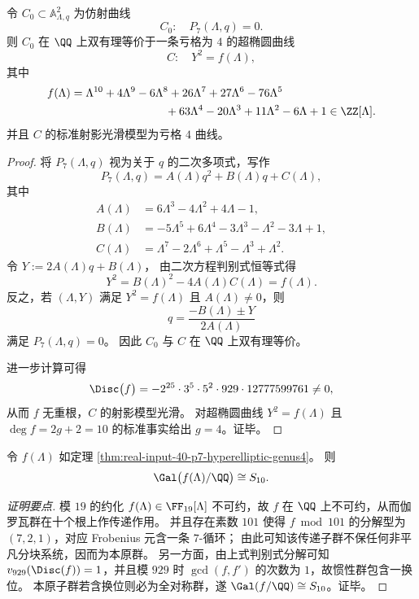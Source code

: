 \begin{theorem}[谱曲线的超椭圆模型与亏格]\label{thm:real-input-40-p7-hyperelliptic-genus4}
令 \(C_0\subset\mathbb{A}^2_{\Lambda,q}\) 为仿射曲线
\[
C_0:\quad P_7(\Lambda,q)=0.
\]
则 \(C_0\) 在 \(\QQ\) 上双有理等价于一条亏格为 \(4\) 的超椭圆曲线
\[
C:\quad Y^2=f(\Lambda),
\]
其中
\[
\begin{aligned}
f(\Lambda)=\;&\Lambda^{10}+4\Lambda^9-6\Lambda^8+26\Lambda^7+27\Lambda^6-76\Lambda^5\\
&\qquad\qquad\qquad\quad +63\Lambda^4-20\Lambda^3+11\Lambda^2-6\Lambda+1\in\ZZ[\Lambda].
\end{aligned}
\]
并且 \(C\) 的标准射影光滑模型为亏格 \(4\) 曲线。
\end{theorem}
\begin{proof}
将 \(P_7(\Lambda,q)\) 视为关于 \(q\) 的二次多项式，写作
\[
P_7(\Lambda,q)=A(\Lambda)q^2+B(\Lambda)q+C(\Lambda),
\]
其中
\[
\begin{aligned}
A(\Lambda)&=6\Lambda^3-4\Lambda^2+4\Lambda-1,\\
B(\Lambda)&=-5\Lambda^5+6\Lambda^4-3\Lambda^3-\Lambda^2-3\Lambda+1,\\
C(\Lambda)&=\Lambda^7-2\Lambda^6+\Lambda^5-\Lambda^3+\Lambda^2.
\end{aligned}
\]
令
\(
Y:=2A(\Lambda)q+B(\Lambda)
\)，
由二次方程判别式恒等式得
\[
Y^2=B(\Lambda)^2-4A(\Lambda)C(\Lambda)=f(\Lambda).
\]
反之，若 \((\Lambda,Y)\) 满足 \(Y^2=f(\Lambda)\) 且 \(A(\Lambda)\neq 0\)，则
\[
q=\frac{-B(\Lambda)\pm Y}{2A(\Lambda)}
\]
满足 \(P_7(\Lambda,q)=0\)。
因此 \(C_0\) 与 \(C\) 在 \(\QQ\) 上双有理等价。
\par
进一步计算可得
\[
\Disc\bigl(f\bigr)=-2^{25}\cdot 3^5\cdot 5^2\cdot 929\cdot 12777599761\neq 0,
\]
从而 \(f\) 无重根，\(C\) 的射影模型光滑。
对超椭圆曲线 \(Y^2=f(\Lambda)\) 且 \(\deg f=2g+2=10\) 的标准事实给出 \(g=4\)。证毕。
\end{proof}

\begin{proposition}[分支十次多项式的满对称伽罗瓦群]\label{prop:real-input-40-p7-branch10-galois-s10}
令 \(f(\Lambda)\) 如定理 \ref{thm:real-input-40-p7-hyperelliptic-genus4}。
则
\[
\Gal\bigl(f(\Lambda)/\QQ\bigr)\cong S_{10}.
\]
\end{proposition}
\begin{proof}[证明要点]
模 \(19\) 的约化 \(f(\Lambda)\in\FF_{19}[\Lambda]\) 不可约，故 \(f\) 在 \(\QQ\) 上不可约，从而伽罗瓦群在十个根上作传递作用。
并且存在素数 \(101\) 使得 \(f\bmod 101\) 的分解型为 \((7,2,1)\)，对应 Frobenius 元含一条 \(7\)-循环；
由此可知该传递子群不保任何非平凡分块系统，因而为本原群。
另一方面，由上式判别式分解可知 \(v_{929}(\Disc(f))=1\)，并且模 \(929\) 时 \(\gcd(f,f')\) 的次数为 \(1\)，故惯性群包含一换位。
本原子群若含换位则必为全对称群，遂 \(\Gal(f/\QQ)\cong S_{10}\)。证毕。
\end{proof}

